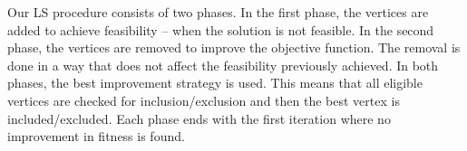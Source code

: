 \documentclass[dvipsnames,format=sigconf]{acmart} %
\begin{document}
Our LS procedure consists of two phases. In the first phase, the vertices are added to achieve feasibility -- when the solution is not feasible. In the second phase, the vertices are removed to improve the objective function. The removal is done in a way that does not affect the feasibility previously achieved. 
In both phases, the best improvement strategy is used. This means that all eligible vertices are checked for inclusion/exclusion and then the best vertex is included/excluded. 
Each phase ends with the first iteration where no improvement in fitness is found.  

\begin{comment}
    \emph{Fast fitness evaluation}. Computing the fitness function (\ref{eq:fitness}) takes $O(|E|)$ time -- the most time consuming part is computing the $\emph{violations}(\cdot)$  function. For dense graphs, this complexity can go up to $O(|V|^2)$. Since local search makes many fitness function calls it is too costly to compute the fitness function from scratch every time. In order to execute \texttt{LocalSearch} procedure  efficiently, fast calculations of the fitness function are applied. Before LS enters the first \texttt{while} loop, $C(D_{best}, v), \forall v \in V$ for given solution $D_{best}$ are computed and saved. During vertex addition, that is  $D' = D_{best} \cup \{v\} $, $violations(D')$ is calculated in the following way: 

\begin{multline}
violations(D') = violations(D_{best}) \\
- (k-C(D_{best}, v))  \texttt{I}_{(C(D_{best},v)<k)}  \\ 
- \sum_{w\in N(v) \setminus D_{best}} \texttt{I}_{(C(D_{best}, w)<k)}
\end{multline}

where \texttt{I} stands for the indicator function. 

The part $-(k- C(D_{best}, v)) \texttt{I}_{(C(D_{best},v)<k)}$ adjusts for the effect of the added vertex $v$, i.e., if $v$ was previously \emph{satisfied} before (satisfied the $k$-domination condition), then this indicator function takes the value zero, so nothing changes. This is true because $v$ remains satisfied -- it is now part of $k$-dominating set. 
Otherwise, if vertex $v$ has previously violated the $k$-domination condition, the total violations are reduced by the previous degree of vertex $v$ violation, i.e. $(k- C(D_{best}, v))$.

The part $- \sum_{w\in N(v) \setminus D_{best}} \texttt{I}_{(C(D_{best}, w)<k)}$ adjust for the effect on the vertex $v$ neighbors, which were not in the $k$-dominating set $D_{best}$, i.e. $W=N(v) \setminus D_{best}$. If some of these vertices $w \in W$ violated $k$-domination condition, adding the adjacent vertex $v$ to the solution reduces the total violations. Otherwise, if a vertex $w$ was satisfied, adding $v$ to the solution does not change anything.  
 
In case of a vertex removal, the similar idea is used. 
\end{comment}
\end{document}
